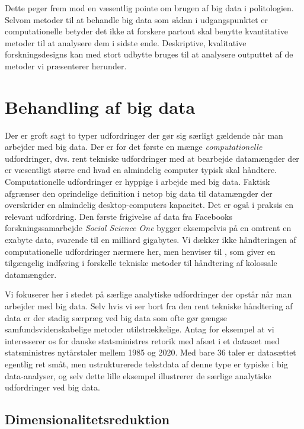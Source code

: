 \documentclass[12pt,]{article}
\begin{document}
Dette peger frem mod en væsentlig pointe om brugen af big data i
politologien. Selvom metoder til at behandle big data som sådan i
udgangspunktet er computationelle betyder det ikke at forskere partout
skal benytte kvantitative metoder til at analysere dem i sidste ende.
Deskriptive, kvalitative forskningsdesigns kan med stort udbytte bruges
til at analysere outputtet af de metoder vi præsenterer herunder.

\hypertarget{behandling-af-big-data}{%
\section{Behandling af big data}\label{behandling-af-big-data}}

Der er groft sagt to typer udfordringer der gør sig særligt gældende når
man arbejder med big data. Der er for det første en mænge
\emph{computationelle} udfordringer, dvs. rent tekniske udfordringer med
at bearbejde datamængder der er væsentligt større end hvad en almindelig
computer typisk skal håndtere. Computationelle udfordringer er hyppige i
arbejde med big data. Faktisk afgrænser den oprindelige definition i
\citet{laney01} netop big data til datamængder der overskrider en
almindelig desktop-computers kapacitet. Det er også i praksis en
relevant udfordring. Den første frigivelse af data fra Facebooks
forskningssamarbejde \emph{Social Science One} bygger eksempelvis på en
omtrent en exabyte data, svarende til en milliard gigabytes. Vi dækker
ikke håndteringen af computationelle udfordringer nærmere her, men
henviser til \citet{varian2014big}, som giver en tilgængelig indføring i
forskelle tekniske metoder til håndtering af kolossale datamængder.

Vi fokuserer her i stedet på særlige analytiske udfordringer der opstår
når man arbejder med big data. Selv hvis vi ser bort fra den rent
tekniske håndtering af data er der stadig særpræg ved big data som ofte
gør gængse samfundsvidenskabelige metoder utilstrækkelige. Antag for
eksempel at vi interesserer os for danske statsministres retorik med
afsæt i et datasæt med statsministres nytårstaler mellem 1985 og 2020.
Med bare 36 taler er datasættet egentlig ret småt, men ustrukturerede
tekstdata af denne type er typiske i big data-analyser, og selv dette
lille eksempel illustrerer de særlige analytiske udfordringer ved big
data.

\hypertarget{dimensionalitetsreduktion}{%
\subsection{Dimensionalitetsreduktion}\label{dimensionalitetsreduktion}}
\end{document}
